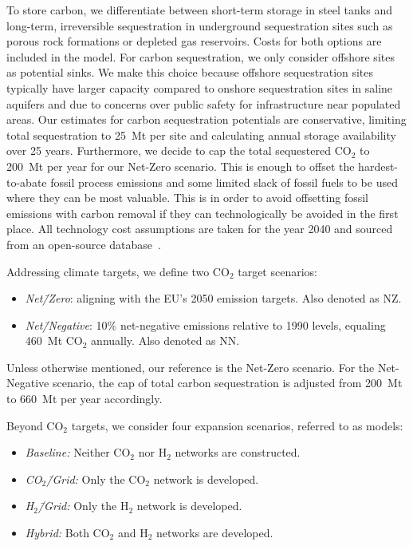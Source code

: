 \documentclass[twocolumn]{article}
\newcommand{\COtwo}{CO$_2$}
\newcommand{\Htwo}{H$_2$}
\newcommand{\COgrid}{CO$_2$\=/Grid}
\newcommand{\Hgrid}{H$_2$\=/Grid}
\begin{document}
To store carbon, we differentiate between short-term storage in steel tanks and long-term, irreversible sequestration in underground sequestration sites such as porous rock formations or depleted gas reservoirs. Costs for both options are included in the model. For carbon sequestration, we only consider offshore sites as potential sinks. We make this choice because offshore sequestration sites typically have larger capacity compared to onshore sequestration sites in saline aquifers and due to concerns over public safety for infrastructure near populated areas. Our estimates for carbon sequestration potentials are conservative, limiting total sequestration to 25~Mt per site and calculating annual storage availability over 25 years. Furthermore, we decide to cap the total sequestered \COtwo{} to 200~Mt per year for our Net-Zero scenario. This is enough to offset the hardest-to-abate fossil process emissions and some limited slack of fossil fuels to be used where they can be most valuable. This is in order to avoid offsetting fossil emissions with carbon removal if they can technologically be avoided in the first place. All technology cost assumptions are taken for the year 2040 and sourced from an open-source database~\cite{lisazeyenPyPSATechnologydataTechnology2023}.


Addressing climate targets, we define two \COtwo{} target scenarios:
\begin{itemize}
    \item[] \textit{Net\=/Zero}: aligning with the EU's 2050 emission targets. Also denoted as NZ.
    \item[] \textit{Net\=/Negative}: 10\% net-negative emissions relative to 1990 levels, equaling 460~Mt \COtwo{} annually. Also denoted as NN.
\end{itemize}
Unless otherwise mentioned, our reference is the Net-Zero scenario. For the Net-Negative scenario, the cap of total carbon sequestration is adjusted from 200~Mt to 660~Mt per year accordingly.

Beyond \COtwo{} targets, we consider four expansion scenarios, referred to as models:
\begin{itemize}
    \item[] \textit{Baseline:} Neither \COtwo{} nor \Htwo{} networks are constructed.
    \item[] \textit{\COgrid{}:} Only the \COtwo{} network is developed.
    \item[] \textit{\Hgrid{}:} Only the \Htwo{} network is developed.
    \item[] \textit{Hybrid:} Both \COtwo{} and \Htwo{} networks are developed.
\end{itemize}
\end{document}
